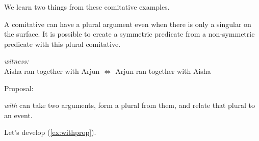 \documentclass[twoside, 12pt]{article}
\begin{document}
We learn two things from these comitative examples.
\begin{exe}
\raggedright
  \ex \label{ex:2things}
  \begin{xlist}
    \ex A comitative can have a plural argument even when there is only a singular on the surface.
    \ex It is possible to create a symmetric predicate from a non-symmetric predicate with this plural comitative.
    \begin{xlist}
      \sn \textit{witness:}\\ Aisha ran together with Arjun $\Leftrightarrow$ Arjun ran together with Aisha
    \end{xlist}
  \end{xlist}
\end{exe}
Proposal:
\begin{exe}
\raggedright
  \ex \label{ex:withprop} \textit{with} can take two arguments, form a plural from them, and relate that plural to an event.
\end{exe}
Let's develop (\ref{ex:withprop}).
\end{document}
